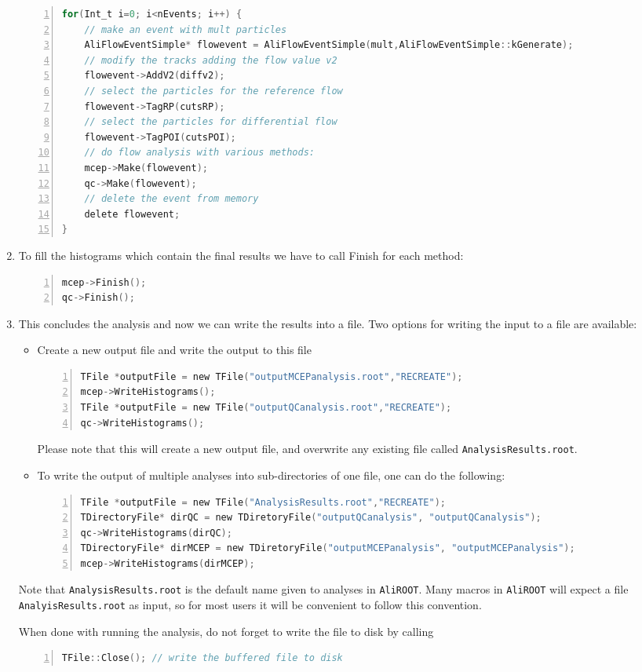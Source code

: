 \documentclass[a4paper]{book}
\numberwithin{equation}{subsection}
\begin{document}
\begin{enumerate}
	\begin{lstlisting}[language=C, numbers=left]
for(Int_t i=0; i<nEvents; i++) { 
    // make an event with mult particles 
    AliFlowEventSimple* flowevent = AliFlowEventSimple(mult,AliFlowEventSimple::kGenerate);
    // modify the tracks adding the flow value v2
    flowevent->AddV2(diffv2);
    // select the particles for the reference flow
    flowevent->TagRP(cutsRP);
    // select the particles for differential flow
    flowevent->TagPOI(cutsPOI);
    // do flow analysis with various methods:
    mcep->Make(flowevent);
    qc->Make(flowevent);
    // delete the event from memory
    delete flowevent;
} \end{lstlisting}
	\item To fill the histograms which contain the final results we have to call Finish for each method:
	\begin{lstlisting}[language=C, numbers=left]
mcep->Finish(); 
qc->Finish(); \end{lstlisting}
	\item This concludes the analysis and now we can write the results into a file. Two options for writing the input to a file are available: 
     \begin{itemize}
     \item Create a new output file and write the output to this file
     \begin{lstlisting}[language=C, numbers=left]
TFile *outputFile = new TFile("outputMCEPanalysis.root","RECREATE");
mcep->WriteHistograms();
TFile *outputFile = new TFile("outputQCanalysis.root","RECREATE");
qc->WriteHistograms();\end{lstlisting}

Please note that this will create a new output file, and overwrite any existing file called \texttt{AnalysisResults.root}.

\item  To write the output of multiple analyses into sub-directories of one file, one can do the following:
\begin{lstlisting}[language=C, numbers=left]
TFile *outputFile = new TFile("AnalysisResults.root","RECREATE");
TDirectoryFile* dirQC = new TDiretoryFile("outputQCanalysis", "outputQCanalysis");
qc->WriteHistograms(dirQC);
TDirectoryFile* dirMCEP = new TDiretoryFile("outputMCEPanalysis", "outputMCEPanalysis");
mcep->WriteHistograms(dirMCEP);
\end{lstlisting}
\end{itemize}

Note that \texttt{AnalysisResults.root}  is the default name given to analyses in \texttt{AliROOT}. Many macros in \texttt{AliROOT} will expect a file \texttt{AnalyisResults.root} as input, so for most users it will be convenient to follow this convention.

When done with running the analysis, do not forget to write the file to disk by calling
\begin{lstlisting}[language=C, numbers=left]
TFile::Close();	// write the buffered file to disk \end{lstlisting}
\end{enumerate}
\end{document}
